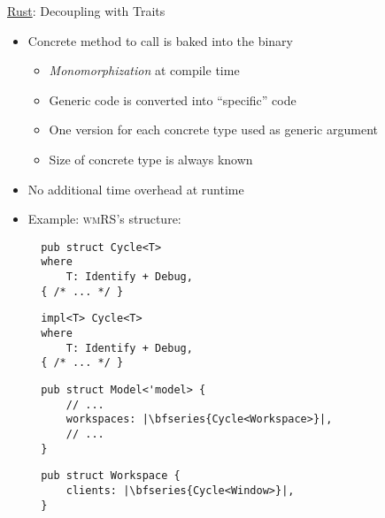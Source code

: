\begin{frame}[fragile]{\underline{Rust}: Decoupling with Traits \hfill {\footnotesize \currentname}}


    \begin{itemize}

        \item Concrete method to call is baked into the binary
            \begin{itemize}
                \item \textit{Monomorphization} at compile time
                \item Generic code is converted into ``specific'' code
                \item One version for each concrete type used as generic argument
                \item Size of concrete type is always known
            \end{itemize}

        \item No additional time overhead at runtime

        \item Example: \textsc{wmRS}'s  structure:\\[3pt]
\begin{minipage}{.45\linewidth}
\begin{verbatim}
  pub struct Cycle<T>
  where
      T: Identify + Debug,
  { /* ... */ }
\end{verbatim}
\begin{verbatim}
  impl<T> Cycle<T>
  where
      T: Identify + Debug,
  { /* ... */ }
\end{verbatim}
\end{minipage}%
\begin{minipage}{.40\linewidth}
\begin{verbatim}
  pub struct Model<'model> {
      // ...
      workspaces: |\bfseries{Cycle<Workspace>}|,
      // ...
  }
\end{verbatim}
\begin{verbatim}
  pub struct Workspace {
      clients: |\bfseries{Cycle<Window>}|,
  }
\end{verbatim}
\end{minipage}

    \end{itemize}

    \vfill

\end{frame}

